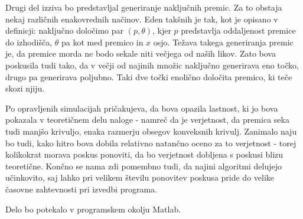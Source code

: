 \documentclass[a4paper]{article}
\begin{document}
Drugi del izziva bo predstavljal generiranje naključnih premic. Za to obstaja nekaj različnih enakovrednih načinov. Eden takšnih je tak, kot je opisano v definicji: naključno določimo par $(p,\theta)$, kjer $p$ predstavlja oddaljenost premice do izhodišča, $\theta$ pa kot med premico in $x$ osjo. Težava takega generiranja premic je, da premice morda ne bodo sekale niti večjega od naših likov. Zato bova poskusila tudi tako, da v večji od najinih množic naključno generirava eno točko, drugo pa generirava poljubno. Taki dve točki enolično določita premico, ki teče skozi njiju.

Po opravljenih simulacijah pričakujeva, da bova opazila lastnost, ki jo bova pokazala v teoretičnem delu naloge - namreč da je verjetnost, da premica seka tudi manjšo krivuljo, enaka razmerju obsegov konveksnih krivulj. Zanimalo naju bo tudi, kako hitro bova dobila relativno natančno oceno za to verjetnost - torej kolikokrat morava poskus ponoviti, da bo verjetnost dobljena s poskusi blizu teoretične. Končno se nama zdi pomembno tudi, da najini algoritmi delujejo učinkovito, saj lahko pri velikem številu ponovitev poskusa pride do velike časovne zahtevnosti pri izvedbi programa. 

Delo bo potekalo v programskem okolju Matlab.

 
\end{document}
